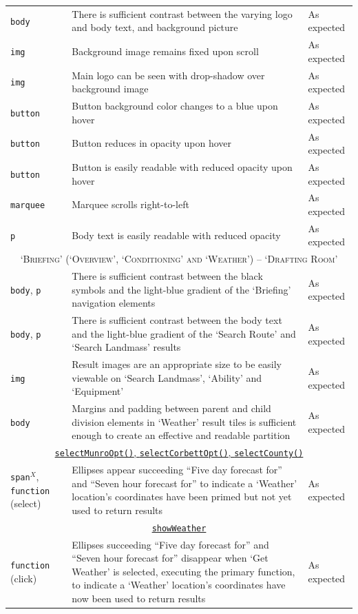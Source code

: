 \documentclass[11pt, english]{article}
\begin{document}
\begin{center}
\begin{longtable}{p{3cm}p{8cm}p{2cm}}
		\hline
		\texttt{body} & There is sufficient contrast between the varying logo and body text, and background picture & As expected\\
		\texttt{img} & Background image remains fixed upon scroll & As expected\\
		\texttt{img} & Main logo can be seen with drop-shadow over background image & As expected\\
		\texttt{button} & Button background color changes to a blue upon hover & As expected\\
		\texttt{button} & Button reduces in opacity upon hover & As expected\\
		\texttt{button} & Button is easily readable with reduced opacity upon hover & As expected\\
		\texttt{marquee} & Marquee scrolls right-to-left & As expected\\
		\texttt{p} & Body text is easily readable with reduced opacity & As expected\\
		\hline
		\multicolumn{3}{c}{\textsc{`Briefing' (`Overview', `Conditioning' and `Weather') -- `Drafting Room'}}\\
		\hline
		\texttt{body}, \texttt{p} & There is sufficient contrast between the black symbols and the light-blue gradient of the `Briefing' navigation elements & As expected\\
		\texttt{body}, \texttt{p} & There is sufficient contrast between the body text and the light-blue gradient of the `Search Route' and `Search Landmass' results & As expected\\
		\texttt{img} & Result images are an appropriate size to be easily viewable on `Search Landmass', `Ability' and `Equipment' & As expected\\
		\texttt{body} & Margins and padding between parent and child division elements in `Weather' result tiles is sufficient enough to create an effective and readable partition & As expected\\
		\multicolumn{3}{c}{\underline{\texttt{selectMunroOpt()}, \texttt{selectCorbettOpt()}, \texttt{selectCounty()}}}\\
		\texttt{span}$^{X}$, \texttt{function} (select) & Ellipses appear succeeding ``Five day forecast for'' and ``Seven hour forecast for'' to indicate a `Weather' location's coordinates have been primed but not yet used to return results & As expected\\
		\multicolumn{3}{c}{\underline{\texttt{showWeather}}}\\
		\texttt{function} (click) & Ellipses succeeding ``Five day forecast for'' and ``Seven hour forecast for'' disappear when `Get Weather' is selected, executing the primary function, to indicate a `Weather' location's coordinates have now been used to return results & As expected\\

\end{longtable}
\end{center}
\end{document}
